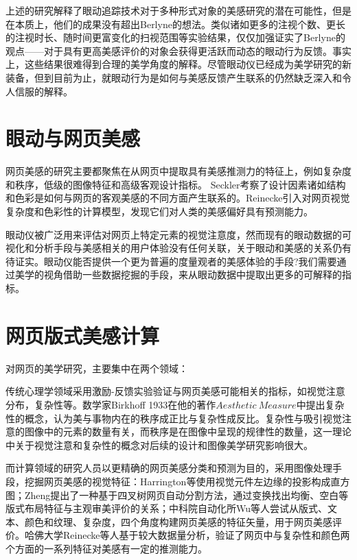 上述的研究解释了眼动追踪技术对于多种形式对象的美感研究的潜在可能性，但是在本质上，他们的成果没有超出Berlyne的想法。类似诸如更多的注视个数、更长的注视时长、随时间更富变化的扫视范围等实验结果，仅仅加强证实了Berlyne的观点——对于具有更高美感评价的对象会获得更活跃而动态的眼动行为反馈。事实上，这些结果很难得到合理的美学角度的解释。尽管眼动仪已经成为美学研究的新装备，但到目前为止，就眼动行为是如何与美感反馈产生联系的仍然缺乏深入和令人信服的解释。


\section{眼动与网页美感}

网页美感的研究主要都聚焦在从网页中提取具有美感推测力的特征上，例如复杂度和秩序，低级的图像特征和高级客观设计指标。
Seckler考察了设计因素诸如结构和色彩是如何与网页的客观美感的不同方面产生联系的。Reinecke引入对网页视觉复杂度和色彩性的计算模型，发现它们对人类的美感偏好具有预测能力。

眼动仪被广泛用来评估对网页上特定元素的视觉注意度，然而现有的眼动数据的可视化和分析手段与美感相关的用户体验没有任何关联，关于眼动和美感的关系仍有待证实。眼动仪能否提供一个更为普遍的度量观者的美感体验的手段?我们需要通过美学的视角借助一些数据挖掘的手段，来从眼动数据中提取出更多的可解释的指标。


\section{网页版式美感计算}

对网页的美学研究，主要集中在两个领域：

传统心理学领域采用激励-反馈实验验证与网页美感可能相关的指标，如视觉注意分布，复杂性等。数学家Birkhoff 1933在他的著作$Aesthetic ~Measure$中提出复杂性的概念，认为美与事物内在的秩序成正比与复杂性成反比。复杂性与吸引视觉注意的图像中的元素的数量有关，而秩序是在图像中呈现的规律性的数量，这一理论中关于视觉注意和复杂性的概念对后续的设计和图像美学研究影响很大。

而计算领域的研究人员以更精确的网页美感分类和预测为目的，采用图像处理手段，挖掘网页美感的视觉特征：Harrington等使用视觉元件左边缘的投影构成直方图；Zheng提出了一种基于四叉树网页自动分割方法，通过变换找出均衡、空白等版式布局特征与主观审美评价的关系；中科院自动化所Wu等人尝试从版式、文本、颜色和纹理、复杂度，四个角度构建网页美感的特征矢量，用于网页美感评价。哈佛大学Reinecke等人基于较大数据量分析，验证了网页中与复杂性和颜色两个方面的一系列特征对美感有一定的推测能力。

